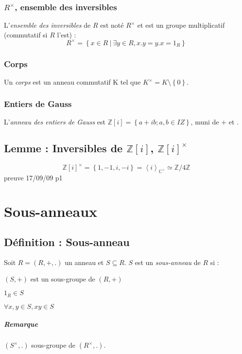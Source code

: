 \documentclass[reqno,a4paper,10pt]{report}
\makeatletter
\newcommand{\gen}[1]{\left\langle #1 \right\rangle} %
\newcommand{\set}[1]{\left\lbrace #1 \right\rbrace} %
\newcommand{\IZ}{\ensuremath{\mathbb{Z}}\xspace} %
\newcommand{\IC}{\ensuremath{\mathbb{C}}\xspace} %
\newcommand{\such}{\ | \ }
\let\olditemize=\itemize%
\renewenvironment{itemize}{%
    \olditemize%
  }{%
    \@noparlisttrue%
    \endlist%
  }%
\makeatother
\begin{document}
\subsection{$R^\times$, ensemble des inversibles}
L'\emph{ensemble des inversibles} de $R$ est noté $R^\times$ et est un groupe
multiplicatif (commutatif si $R$ l'est) :
\[R^\times = \set{x \in R \such \exists y \in R, x.y =y.x = 1_R}\]

\subsection{Corps}
Un \emph{corps} est un anneau commutatif K tel que $K^{\times} =
K\setminus\set{0}$.

\subsection{Entiers de Gauss}
L'\emph{anneau des entiers de Gauss} est $\IZ[i]=\set{a+ib; a, b \in IZ}$,
muni de $+$ et $.$

\section{Lemme : Inversibles de $\IZ[i]$, ${\IZ[i]}^\times$}
\[{\IZ[i]}^\times = \set{1,-1,i,-i} = \gen{i}_{\IC^\times} \simeq \IZ/4\IZ\]
  preuve 17/09/09 p1


\chapter{Sous-anneaux}
\section{Définition : Sous-anneau}
Soit $R=(R,+,.)$ un anneau et $S \subseteq R$. $S$ est un \emph{sous-anneau}
de $R$ si :
\begin{itemize}
  \item $(S,+)$ est un sous-groupe de $(R,+)$
  \item $1_R \in S$
  \item $\forall x,y \in S, xy \in S$
\end{itemize}

\paragraph{Remarque} $(S^\times, .)$ sous-groupe de $(R^\times, .)$.
\end{document}
